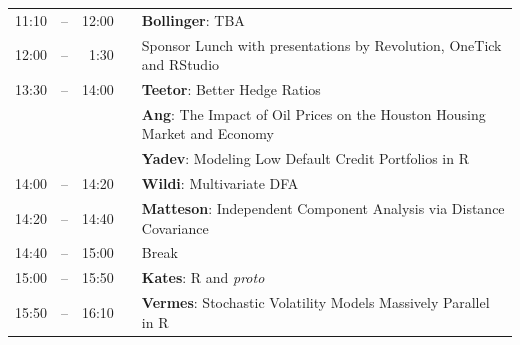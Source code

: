 \documentclass[10pt]{article}
\newcommand{\mylinecolor}[1]{\color{#1}\vspace{-8pt}}  %
\begin{document}
\begin{tabular}{rlrlp{5in}}
  11:10 & -- & 12:00 &   & \textbf{\color{KeynoteTalk} Bollinger}: \small{TBA} \\
  12:00 & -- &  1:30 &   & \small{\mylinecolor{Breaks}  Sponsor Lunch with presentations by Revolution, OneTick and RStudio}  \\
   13:30 & -- &  14:00 &   & \textbf{\color{LightningTalk} Teetor}: \small{Better Hedge Ratios} \\
          &    &         &   & \textbf{\color{LightningTalk} Ang}: \small{The Impact of Oil Prices on the Houston Housing Market and Economy} \\
          &    &         &   & \textbf{\color{LightningTalk} Yadev}: \small{Modeling Low Default Credit Portfolios in R} \\
  14:00  & -- &  14:20 &   & \textbf{\color{Talk} Wildi}: \small{Multivariate DFA} \\
  14:20  & -- &  14:40 &   & \textbf{\color{Talk} Matteson}: \small{Independent Component Analysis via Distance Covariance} \\
   14:40 & -- & 15:00  &   & \small{\mylinecolor{Breaks} Break} \\
   15:00 & -- & 15:50  &   & \textbf{\color{KeynoteTalk} Kates}: \small{R and \emph{proto}} \\
   15:50 & -- & 16:10  &   & \textbf{\color{Talk} Vermes}: \small{Stochastic Volatility Models Massively Parallel in R} \\

\end{tabular}
\end{document}
